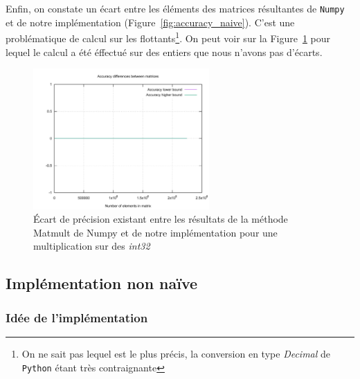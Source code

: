 Enfin, on constate un écart entre les éléments des matrices résultantes de \texttt{Numpy} et 
de notre implémentation (Figure~\ref{fig:accuracy_naive}). C'est une problématique de calcul 
sur les flottants\footnote{On ne sait pas lequel est le plus précis, la conversion en type \textit{Decimal} 
de \texttt{Python} étant très contraignante}. On peut voir sur la Figure~\ref{fig:accuracy_naive_integers} pour lequel
le calcul a été éffectué sur des entiers que nous n'avons pas d'écarts.

\begin{figure}[H]
\begin{center}
    \includegraphics[width=0.6\textwidth]{../../resources/naive_integer_accuracy.png}
    \caption{Écart de précision existant entre les résultats de la méthode Matmult de Numpy 
    et de notre implémentation pour une multiplication sur des \textit{int32}}
    \label{fig:accuracy_naive_integers}
\end{center}
\end{figure}

\subsection{Implémentation non naïve}  

\subsubsection{Idée de l'implémentation}

